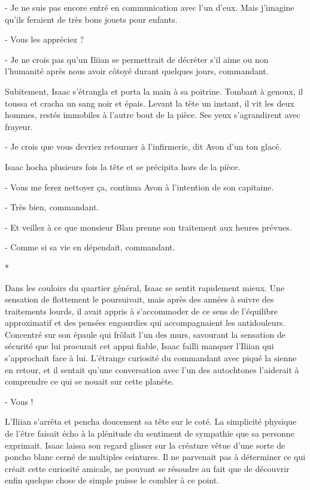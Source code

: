 \documentclass[12pt]{book}
\newcommand{\s}{\begin{center}
*
\end{center}
}
\begin{document}
- Je ne suis pas encore entré en communication avec l’un d’eux. Mais j’imagine qu’ils feraient de très bons jouets pour enfants.

- Vous les appréciez ?

- Je ne crois pas qu’un Iliian se permettrait de décréter s’il aime ou non l’humanité après nous avoir côtoyé durant quelques jours, commandant.

Subitement, Isaac s’étrangla et porta la main à sa poitrine. Tombant à genoux, il toussa et cracha un sang noir et épais. Levant la tête un instant, il vit les deux hommes, restés immobiles à l’autre bout de la pièce. Ses yeux s’agrandirent avec frayeur.

- Je crois que vous devriez retourner à l’infirmerie, dit Avon d'un ton glacé.


Isaac hocha plusieurs fois la tête et se précipita hors de la pièce.


- Vous me ferez nettoyer ça, continua Avon à l'intention de son capitaine.

- Très bien, commandant.

- Et veillez à ce que monsieur Blau prenne son traitement aux heures prévues.

 -  Comme si sa vie en dépendait, commandant.


\s


Dans les couloirs du quartier général, Isaac se sentit rapidement mieux. Une sensation de flottement le poursuivait, mais après des années à suivre des traitements lourds, il avait appris à s’accommoder de ce sens de l’équilibre approximatif et des pensées engourdies qui accompagnaient les antidouleurs. Concentré sur son épaule qui frôlait l’un des murs, savourant la sensation de sécurité que lui procurait cet appui fiable, Isaac failli manquer l’Iliian qui s’approchait face à lui. L’étrange curiosité du commandant avec piqué la sienne en retour, et il sentait qu’une conversation avec l’un des autochtones l’aiderait à comprendre ce qui se nouait sur cette planète.


  -  Vous !


L’Iliian s’arrêta et pencha doucement sa tête sur le coté. La simplicité physique de l’être faisait écho à la plénitude du sentiment de sympathie que sa personne exprimait. Isaac laissa son regard glisser sur la créature vêtue d’une sorte de poncho blanc cerné de multiples ceintures. Il ne parvenait pas à déterminer ce qui créait cette curiosité amicale, ne pouvant se résoudre au fait que de découvrir enfin quelque chose de simple puisse le combler à ce point.
\end{document}
